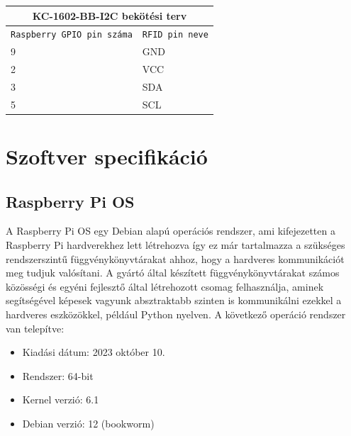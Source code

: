 \documentclass[11pt, a4paper]{article}
\begin{document}
		\begin{minipage}{.5\textwidth}
			\fontsize{10}{16}\selectfont
			\centering
			\begin{tabular}{||m{6em} m{8em}||}
				\hline
				\multicolumn{2}{|c|}{\textbf{KC-1602-BB-I2C bekötési terv}} \\
				\hline
				\texttt{Raspberry GPIO pin száma} & \texttt{RFID pin neve} \\
				\hline\hline
				9 & GND \\ 
				\hline
				2 & VCC \\ 
				\hline
				3 & SDA \\ 
				\hline
				5 & SCL \\
				\hline
			\end{tabular}
			\label{table:lcdconnections}
		\end{minipage}
		
	\section{Szoftver specifikáció}
		\subsection{Raspberry Pi OS}
			\begin{flushleft}
				\justifying
				A Raspberry Pi OS egy Debian alapú operációs rendszer, ami kifejezetten a Raspberry Pi hardverekhez lett létrehozva így ez már tartalmazza a szükséges rendszerszintű függvénykönyvtárakat ahhoz, hogy a hardveres kommunikációt meg tudjuk valósítani. A gyártó által készített függvénykönyvtárakat számos közösségi és egyéni fejlesztő által létrehozott csomag felhasználja, aminek segítségével képesek vagyunk absztraktabb szinten is kommunikálni ezekkel a hardveres eszközökkel, például Python nyelven. A következő operáció rendszer van telepítve:
				\begin{itemize}
					\item Kiadási dátum: 2023 október 10.
					\item Rendszer: 64-bit
					\item Kernel verzió: 6.1
					\item Debian verzió: 12 (bookworm)
				\end{itemize}

			\end{flushleft}
\end{document}
